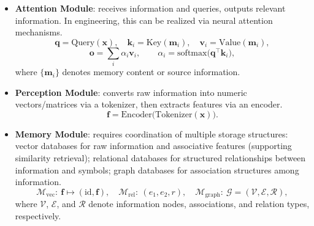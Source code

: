 \documentclass[12pt,a4paper]{article}
\newcommand{\Mem}{\mathcal{M}}
\begin{document}
\begin{itemize}
\item \textbf{Attention Module}: receives information and queries, outputs relevant information. In engineering, this can be realized via neural attention mechanisms.
\begin{equation}
\mathbf{q}=\mathrm{Query}(\mathbf{x}),\quad
\mathbf{k}_i=\mathrm{Key}(\mathbf{m}_i),\quad
\mathbf{v}_i=\mathrm{Value}(\mathbf{m}_i),
\label{eq:module-attention-qkv}
\end{equation}
\begin{equation}
\mathbf{o}=\sum_i\alpha_i\mathbf{v}_i,\qquad
\alpha_i=\mathrm{softmax}\bigl(\mathbf{q}^{\top}\mathbf{k}_i\bigr),
\label{eq:module-attention-out}
\end{equation}
where $\{\mathbf{m}_i\}$ denotes memory content or source information.

\item \textbf{Perception Module}: converts raw information into numeric vectors/matrices via a tokenizer, then extracts features via an encoder.
\begin{equation}
\mathbf{f}=\mathrm{Encoder}\bigl(\mathrm{Tokenizer}(\mathbf{x})\bigr).
\label{eq:module-perception}
\end{equation}

\item \textbf{Memory Module}: requires coordination of multiple storage structures: vector databases for raw information and associative features (supporting similarity retrieval); relational databases for structured relationships between information and symbols; graph databases for association structures among information.
\begin{equation}
\Mem_{\mathrm{vec}}:\ \mathbf{f}\mapsto(\mathrm{id},\mathbf{f}),\quad
\Mem_{\mathrm{rel}}:\ (e_1,e_2,r),\quad
\Mem_{\mathrm{graph}}:\ \mathcal{G}=(\mathcal{V},\mathcal{E},\mathcal{R}),
\label{eq:module-memory}
\end{equation}
where $\mathcal{V}$, $\mathcal{E}$, and $\mathcal{R}$ denote information nodes, associations, and relation types, respectively.


\end{itemize}
\end{document}
